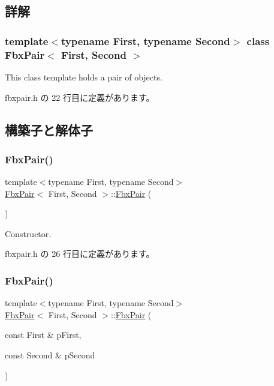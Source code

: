 \subsection{詳解}
\subsubsection*{template$<$typename First, typename Second$>$\newline
class Fbx\+Pair$<$ First, Second $>$}

This class template holds a pair of objects. 

 fbxpair.\+h の 22 行目に定義があります。



\subsection{構築子と解体子}
\mbox{\label{class_fbx_pair_ae542e6310c76b51c6208724fb18f3b96}} 
\subsubsection{\texorpdfstring{Fbx\+Pair()}{FbxPair()}\hspace{0.1cm}{\footnotesize\ttfamily [1/2]}}
{\footnotesize\ttfamily template$<$typename First, typename Second$>$ \\
\hyperlink{class_fbx_pair}{Fbx\+Pair}$<$ First, Second $>$\+::\hyperlink{class_fbx_pair}{Fbx\+Pair} (\begin{DoxyParamCaption}{ }\end{DoxyParamCaption})\hspace{0.3cm}{\ttfamily [inline]}}



Constructor. 



 fbxpair.\+h の 26 行目に定義があります。

\mbox{\label{class_fbx_pair_a7e8efc2156e23d213128de686aba4def}} 
\subsubsection{\texorpdfstring{Fbx\+Pair()}{FbxPair()}\hspace{0.1cm}{\footnotesize\ttfamily [2/2]}}
{\footnotesize\ttfamily template$<$typename First, typename Second$>$ \\
\hyperlink{class_fbx_pair}{Fbx\+Pair}$<$ First, Second $>$\+::\hyperlink{class_fbx_pair}{Fbx\+Pair} (\begin{DoxyParamCaption}\item[{const First \&}]{p\+First,  }\item[{const Second \&}]{p\+Second }\end{DoxyParamCaption})\hspace{0.3cm}{\ttfamily [inline]}}

